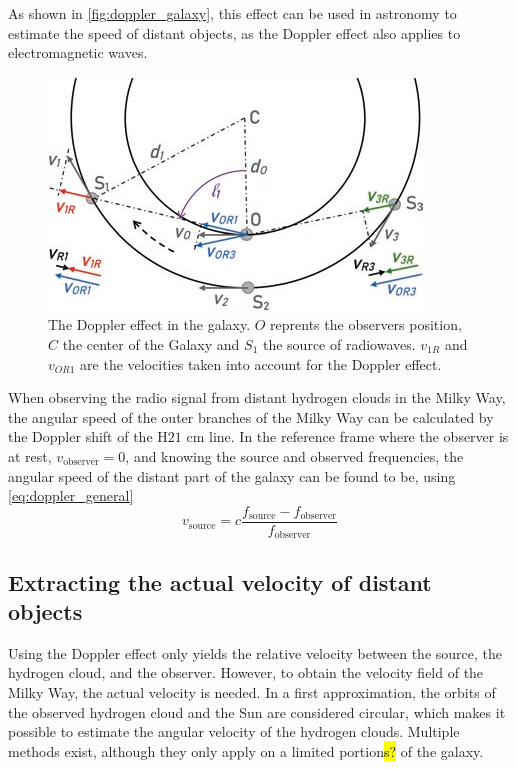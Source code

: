 As shown in \autoref{fig:doppler_galaxy}, this effect can be used in astronomy to estimate the speed of distant objects, as the Doppler effect also applies to electromagnetic waves.
\begin{figure}[htbp]
    \centering
    \includegraphics[width=0.6\linewidth]{figures/doppler_galaxy.png}
    \caption{The Doppler effect in the galaxy. $O$ reprents the observers position, $C$ the center of the Galaxy and $S_1$ the source of radiowaves. $v_{1R}$ and $v_{OR1}$ are the velocities taken into account for the Doppler effect. \cite{lauterbach_radio_2022}}
    \label{fig:doppler_galaxy}
\end{figure}
When observing the radio signal from distant hydrogen clouds in the Milky Way, the angular speed of the outer branches of the Milky Way can be calculated by the Doppler shift of the H$21$ cm line.
In the reference frame where the observer is at rest, $v_\textrm{observer} = 0$, and knowing the source and observed frequencies, the angular speed of the distant part of the galaxy can be found to be, using \autoref{eq:doppler_general}
\begin{equation}
    v_\textrm{source} = c \frac{f_\textrm{source} - f_\textrm{observer}}{f_\textrm{observer}}
    \label{eq:doppler}
\end{equation}

\subsection{Extracting the actual velocity of distant objects}
\label{sec:velocity_of_clouds}
Using the Doppler effect only yields the relative velocity between the source, the hydrogen cloud, and the observer. However, to obtain the velocity field of the Milky Way, the actual velocity is needed. In a first approximation, the orbits of the observed hydrogen cloud and the Sun are considered circular, which makes it possible to estimate the angular velocity of the hydrogen clouds. Multiple methods exist, although they only apply on a limited portion\hl{s?} of the galaxy.

